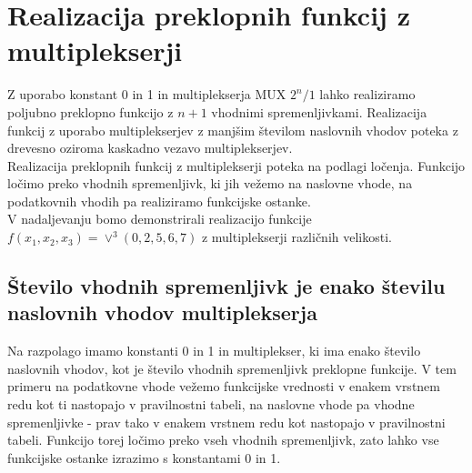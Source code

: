 \section{Realizacija preklopnih funkcij z multiplekserji}

Z uporabo konstant 0 in 1 in multiplekserja MUX $2^n/1$ lahko realiziramo poljubno preklopno funkcijo z $n+1$ vhodnimi spremenljivkami. Realizacija funkcij z uporabo multiplekserjev z manjšim številom naslovnih vhodov poteka z drevesno oziroma kaskadno vezavo multiplekserjev.\\

Realizacija preklopnih funkcij z multiplekserji poteka na podlagi ločenja. Funkcijo ločimo preko vhodnih spremenljivk, ki jih vežemo na naslovne vhode, na podatkovnih vhodih pa realiziramo funkcijske ostanke.\\

V nadaljevanju bomo demonstrirali realizacijo funkcije $f(x_1, x_2, x_3) = \vee^3(0, 2, 5, 6, 7)$ z multiplekserji različnih velikosti.

\subsection{Število vhodnih spremenljivk je enako številu naslovnih vhodov multiplekserja}

Na razpolago imamo konstanti 0 in 1 in multiplekser, ki ima enako število naslovnih vhodov, kot je število vhodnih spremenljivk preklopne funkcije. V tem primeru na podatkovne vhode vežemo funkcijske vrednosti v enakem vrstnem redu kot ti nastopajo v pravilnostni tabeli, na naslovne vhode pa vhodne spremenljivke - prav tako v enakem vrstnem redu kot nastopajo v pravilnostni tabeli. Funkcijo torej ločimo preko vseh vhodnih spremenljivk, zato lahko vse funkcijske ostanke izrazimo s konstantami 0 in 1.

